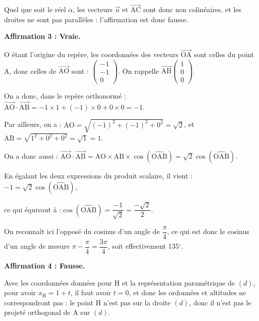 \documentclass[10pt]{article}
\providecommand{\vect}[1]{\overrightarrow{#1}}
\begin{document}
Quel que soit le réel $\alpha$, les vecteurs $ \vect{u} $ et $ \vect{\mathrm{AC}} $ sont donc non colinéaires, et les droites ne sont pas parallèles : l'affirmation est donc fausse.

\medskip

\textbf{Affirmation 3 : Vraie.}

O étant l'origine du repère, les coordonnées des vecteurs $ \vect{\mathrm{OA}} $ sont celles du point A, donc celles de $ \vect{\mathrm{AO}} $ sont : $ \begin{pmatrix}-1\\-1\\0\end{pmatrix}$. On rappelle $ \vect{\mathrm{AB}}\begin{pmatrix} 1 \\ 0 \\ 0\end{pmatrix} $.

On a donc, dans le repère orthonormé : \quad$ \vect{\mathrm{AO}} \cdot \vect{\mathrm{AB}} = -1 \times 1 + (-1) \times 0 + 0 \times 0 = -1$.

Par ailleurs, on a : \quad $ \mathrm{AO} = \sqrt{(-1)^2 + (-1)^2 + 0^2} = \sqrt{2} $, \quad et \quad $ \mathrm{AB} = \sqrt{1^2 + 0^2 + 0^2} = \sqrt{1} = 1$.

On a donc aussi : \quad $ \vect{\mathrm{AO}} \cdot \vect{\mathrm{AB}} = \mathrm{AO} \times \mathrm{AB} \times \cos \left( \widehat{\mathrm{OAB}}\right) = \sqrt{2} \cos \left( \widehat{\mathrm{OAB}}\right)$.

En égalant les deux expressions du produit scalaire, il vient :
\quad $-1 = \sqrt{2}\cos \left(\widehat{\mathrm{OAB}}\right)$,

ce qui équivaut à :\quad $\cos \left(\widehat{\mathrm{OAB}}\right) = \dfrac{-1}{\sqrt{2}} = \dfrac{-\sqrt{2}}{2}$.

On reconnaît ici l'opposé du cosinus d'un angle de $ \dfrac{\pi}{4} $, ce qui est donc le cosinus d'un angle de mesure $\pi - \dfrac{\pi}{4} = \dfrac{3\pi}{4}$, soit effectivement 135\ensuremath{^\circ}.

\medskip

\textbf{Affirmation 4 : Fausse.}

Avec les coordonnées données pour H et la représentation paramétrique de $(d)$, pour avoir $x_\mathrm{H} = 1 + t$, il faut avoir $t = 0$, et donc les ordonnées et altitudes ne correspondront pas : le point H n'est pas sur la droite $(d)$, donc il n'est pas le projeté orthogonal de A sur $(d)$.
\end{document}
